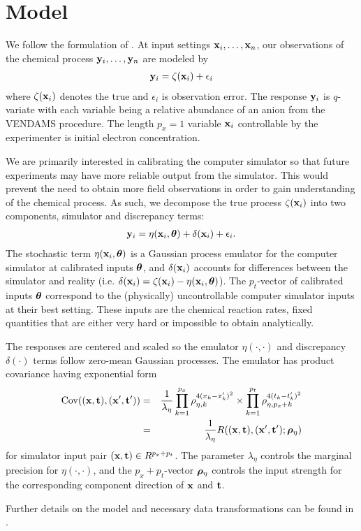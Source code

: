 \section{Model}

We follow the formulation of \cite{kennedy:2001}. At input settings $\mathbf{\bm{x}}_i,\ldots,\mathbf{\bm{x}}_n$, our observations of the chemical process $\mathbf{\bm{y}}_i,\ldots,\mathbf{\bm{y}}_n$ are modeled by
\begin{eqnarray}
\mathbf{\bm{y}}_i = \zeta(\mathbf{\bm{x}}_i) + \epsilon_i
\end{eqnarray}
where $\zeta(\mathbf{\bm{x}}_i)$ denotes the true and $\epsilon_i$ is observation error. The response $\mathbf{\bm{y}}_i$ is $q$-variate with each variable being a relative abundance of an anion from the VENDAMS procedure. The length $p_x=1$ variable $\mathbf{\bm{x}}_i$ controllable by the experimenter is initial electron concentration.

We are primarily interested in calibrating the computer simulator so that future experiments may have more reliable output from the simulator. This would prevent the need to obtain more field observations in order to gain understanding of the chemical process. As such, we decompose the true process $\zeta(\mathbf{\bm{x}}_i)$ into two components, simulator and discrepancy terms:
\begin{eqnarray}
\mathbf{\bm{y}}_i = \eta(\mathbf{\bm{x}}_i, \mathbf{\bm{\theta}}) + \delta(\mathbf{\bm{x}}_i) + \epsilon_i.
\end{eqnarray}
The stochastic term $\eta(\mathbf{\bm{x}}_i, \mathbf{\bm{\theta}})$ is a Gaussian process emulator for the computer simulator at calibrated inputs $\mathbf{\bm{\theta}}$, and $\delta(\mathbf{\bm{x}}_i)$ accounts for differences between the simulator and reality (i.e. $\delta(\mathbf{\bm{x}}_i) = \zeta(\mathbf{\bm{x}}_i) - \eta(\mathbf{\bm{x}}_i, \mathbf{\bm{\theta}})$). The $p_t$-vector of calibrated inputs $\mathbf{\bm{\theta}}$ correspond to the (physically) uncontrollable computer simulator inputs at their best setting. These inputs are the chemical reaction rates, fixed quantities that are either very hard or impossible to obtain analytically.

The responses are centered and scaled so the emulator $\eta(\cdot, \cdot)$ and discrepancy $\delta(\cdot)$ terms follow zero-mean Gaussian processes. The emulator has product covariance having exponential form
\begin{eqnarray}
\mathrm{Cov}((\mathbf{\bm{x}},\mathbf{\bm{t}}),(\mathbf{\bm{x}}',\mathbf{\bm{t}}')) &=& \frac{1}{\lambda_\eta}\prod_{k=1}^{p_x}\rho_{\eta,k}^{4(x_k-x_k')^2}\times\prod_{k=1}^{p_t}\rho_{\eta,p_x+k}^{4(t_k-t_k')^2} \\
&=& \frac{1}{\lambda_\eta}R((\mathbf{\bm{x}},\mathbf{\bm{t}}),(\mathbf{\bm{x}}',\mathbf{\bm{t}}'); \mathbf{\bm{\rho}}_\eta) 
\end{eqnarray}
for simulator input pair $(\mathbf{\bm{x}},\mathbf{\bm{t}})\in R^{p_x+p_t}$. The parameter $\lambda_\eta$ controls the marginal precision for $\eta(\cdot, \cdot)$, and the $p_x+p_t$-vector $\mathbf{\bm{\rho}}_\eta$ controls the input strength for the corresponding component direction of $\mathbf{\bm{x}}$ and $\mathbf{\bm{t}}$.

Further details on the model and necessary data transformations can be found in \cite{higdon:2008}.
